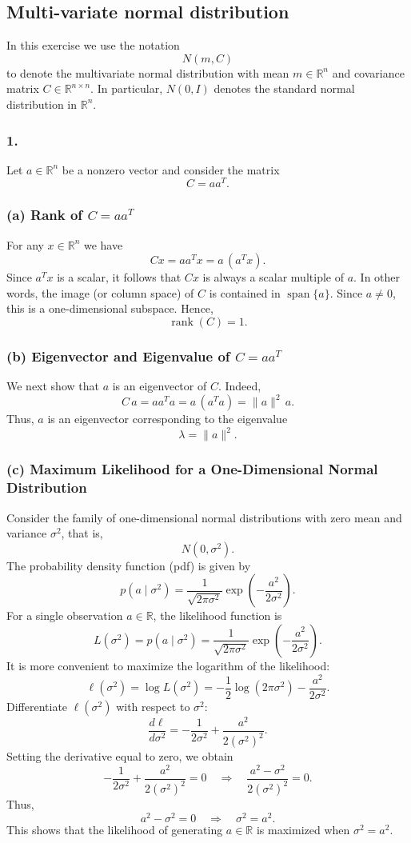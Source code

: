 \subsection{Multi-variate normal distribution}

In this exercise we use the notation 
\[
N(m,C)
\]
to denote the multivariate normal distribution with mean $m\in\mathbb{R}^n$ and covariance matrix $C\in\mathbb{R}^{n\times n}$. In particular, $N(0,I)$ denotes the standard normal distribution in $\mathbb{R}^n$.

\subsubsection*{1.}
Let $a\in\mathbb{R}^n$ be a nonzero vector and consider the matrix
\[
C = aa^T.
\]

\subsubsection*{(a) Rank of $C=aa^T$}
For any $x\in\mathbb{R}^n$ we have
\[
C x = aa^T x = a \, (a^T x).
\]
Since $a^T x$ is a scalar, it follows that $Cx$ is always a scalar multiple of $a$. In other words, the image (or column space) of $C$ is contained in $\operatorname{span}\{a\}$. Since $a\neq 0$, this is a one-dimensional subspace. Hence, 
\[
\operatorname{rank}(C)=1.
\]

\subsubsection*{(b) Eigenvector and Eigenvalue of $C=aa^T$}
We next show that $a$ is an eigenvector of $C$. Indeed,
\[
C\,a = aa^T a = a\,(a^T a) = \|a\|^2\,a.
\]
Thus, $a$ is an eigenvector corresponding to the eigenvalue 
\[
\lambda = \|a\|^2.
\]

\subsubsection*{(c) Maximum Likelihood for a One-Dimensional Normal Distribution}
Consider the family of one-dimensional normal distributions with zero mean and variance $\sigma^2$, that is, 
\[
N(0,\sigma^2).
\]
The probability density function (pdf) is given by
\[
p(a\mid \sigma^2)=\frac{1}{\sqrt{2\pi\sigma^2}}\exp\left(-\frac{a^2}{2\sigma^2}\right).
\]
For a single observation $a\in\mathbb{R}$, the likelihood function is
\[
L(\sigma^2)=p(a\mid \sigma^2)=\frac{1}{\sqrt{2\pi\sigma^2}}\exp\left(-\frac{a^2}{2\sigma^2}\right).
\]
It is more convenient to maximize the logarithm of the likelihood:
\[
\ell(\sigma^2)=\log L(\sigma^2)=-\frac{1}{2}\log(2\pi\sigma^2)-\frac{a^2}{2\sigma^2}.
\]
Differentiate $\ell(\sigma^2)$ with respect to $\sigma^2$:
\[
\frac{d\ell}{d\sigma^2}=-\frac{1}{2\sigma^2}+\frac{a^2}{2(\sigma^2)^2}.
\]
Setting the derivative equal to zero, we obtain
\[
-\frac{1}{2\sigma^2}+\frac{a^2}{2(\sigma^2)^2}=0 
\quad\Longrightarrow\quad \frac{a^2-\sigma^2}{2(\sigma^2)^2}=0.
\]
Thus,
\[
a^2-\sigma^2=0\quad\Longrightarrow\quad \sigma^2=a^2.
\]
This shows that the likelihood of generating $a\in\mathbb{R}$ is maximized when $\sigma^2=a^2$.

